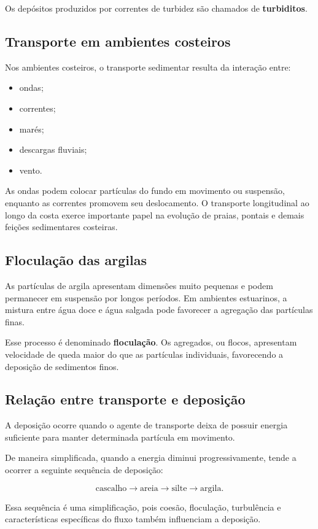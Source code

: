 Os depósitos produzidos por correntes de turbidez são chamados de
\textbf{turbiditos}.

\subsection{Transporte em ambientes costeiros}

Nos ambientes costeiros, o transporte sedimentar resulta da interação entre:

\begin{itemize}
    \item ondas;
    \item correntes;
    \item marés;
    \item descargas fluviais;
    \item vento.
\end{itemize}

As ondas podem colocar partículas do fundo em movimento ou suspensão, enquanto
as correntes promovem seu deslocamento. O transporte longitudinal ao longo da
costa exerce importante papel na evolução de praias, pontais e demais feições
sedimentares costeiras.

\subsection{Floculação das argilas}

As partículas de argila apresentam dimensões muito pequenas e podem permanecer
em suspensão por longos períodos. Em ambientes estuarinos, a mistura entre água
doce e água salgada pode favorecer a agregação das partículas finas.

Esse processo é denominado \textbf{floculação}. Os agregados, ou flocos,
apresentam velocidade de queda maior do que as partículas individuais,
favorecendo a deposição de sedimentos finos.

\subsection{Relação entre transporte e deposição}

A deposição ocorre quando o agente de transporte deixa de possuir energia
suficiente para manter determinada partícula em movimento.

De maneira simplificada, quando a energia diminui progressivamente, tende a
ocorrer a seguinte sequência de deposição:

\[
\text{cascalho}
\rightarrow
\text{areia}
\rightarrow
\text{silte}
\rightarrow
\text{argila}.
\]

Essa sequência é uma simplificação, pois coesão, floculação, turbulência e
características específicas do fluxo também influenciam a deposição.


